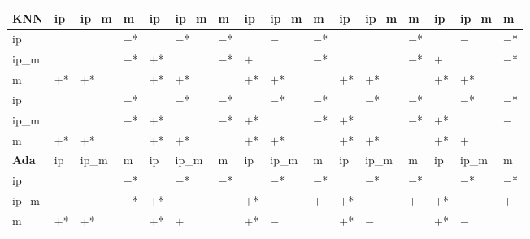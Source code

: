 \begin{table}[htbp]
{\begin{tabular}{l|lll|lll|lll|lll|lll}
\hline
\textbf{KNN} & ip         & ip\_m      & m          & ip         & ip\_m      & m          & ip         & ip\_m      & m          & ip         & ip\_m      & m          & ip         & ip\_m      & m           \\
\hline
ip           &            &            & $-$*       &            & $-$*       & $-$*       &            & $-$        & $-$*       &            &            & $-$*       &            & $-$        & $-$*        \\
ip\_m        &            &            & $-$*       & $+$*       &            & $-$*       & $+$        &            & $-$*       &            &            & $-$*       & $+$        &            & $-$*        \\
m            & $+$*       & $+$*       &            & $+$*       & $+$*       &            & $+$*       & $+$*       &            & $+$*       & $+$*       &            & $+$*       & $+$*       &             \\
\hline
\hline
ip           &            &            & $-$*       &            & $-$*       & $-$*       &            & $-$*       & $-$*       &            & $-$*       & $-$*       &            & $-$*       & $-$*        \\
ip\_m        &            &            & $-$*       & $+$*       &            & $-$*       & $+$*       &            & $-$*       & $+$*       &            & $-$*       & $+$*       &            & $-$         \\
m            & $+$*       & $+$*       &            & $+$*       & $+$*       &            & $+$*       & $+$*       &            & $+$*       & $+$*       &            & $+$*       & $+$        &             \\
\hline
\textbf{Ada} & ip         & ip\_m      & m          & ip         & ip\_m      & m          & ip         & ip\_m      & m          & ip         & ip\_m      & m          & ip         & ip\_m      & m           \\
\hline
ip           &            &            & $-$*       &            & $-$*       & $-$*       &            & $-$*       & $-$*       &            & $-$*       & $-$*       &            & $-$*       & $-$*        \\
ip\_m        &            &            & $-$*       & $+$*       &            & $-$        & $+$*       &            & $+$        & $+$*       &            & $+$        & $+$*       &            & $+$         \\
m            & $+$*       & $+$*       &            & $+$*       & $+$        &            & $+$*       & $-$        &            & $+$*       & $-$        &            & $+$*       & $-$        &             \\

\end{tabular}}
\end{table}
